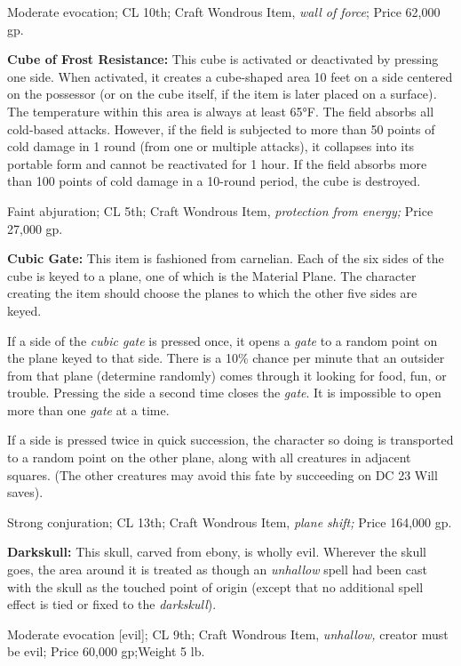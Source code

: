 Moderate evocation; CL 10th; Craft Wondrous Item, \textit{wall of force}; Price 
62,000 gp.

\textbf{Cube of Frost Resistance:} This cube is activated or deactivated by pressing 
one side. When activated, it creates a cube-shaped area 10 feet on a side centered 
on the possessor (or on the cube itself, if the item is later placed on a surface)\textit{. 
}The temperature within this area is always at least 65°F. The field absorbs all 
cold-based attacks. However, if the field is subjected to more than 50 points of 
cold damage in 1 round (from one or multiple attacks), it collapses into its portable 
form and cannot be reactivated for 1 hour. If the field absorbs more than 100 points 
of cold damage in a 10-round period, the cube is destroyed.

Faint abjuration; CL 5th; Craft Wondrous Item, \textit{protection from energy; 
}Price 27,000 gp.

\textbf{Cubic Gate: }This item is fashioned from carnelian. Each of the six sides 
of the cube is keyed to a plane, one of which is the Material Plane. The character 
creating the item should choose the planes to which the other five sides are keyed.

If a side of the \textit{cubic gate }is pressed once, it opens a \textit{gate }to 
a random point on the plane keyed to that side. There is a 10\% chance per minute 
that an outsider from that plane (determine randomly) comes through it looking 
for food, fun, or trouble. Pressing the side a second time closes the \textit{gate}. 
It is impossible to open more than one \textit{gate }at a time.

If a side is pressed twice in quick succession, the character so doing is transported 
to a random point on the other plane, along with all creatures in adjacent squares. 
(The other creatures may avoid this fate by succeeding on DC 23 Will saves).

Strong conjuration; CL 13th; Craft Wondrous Item, \textit{plane shift; }Price 164,000 
gp.

\textbf{Darkskull: }This skull, carved from ebony, is wholly evil. Wherever the 
skull goes, the area around it is treated as though an \textit{unhallow }spell 
had been cast with the skull as the touched point of origin (except that no additional 
spell effect is tied or fixed to the \textit{darkskull}).

Moderate evocation [evil]; CL 9th; Craft Wondrous Item, \textit{unhallow, }creator 
must be evil; Price 60,000 gp;Weight 5 lb.

